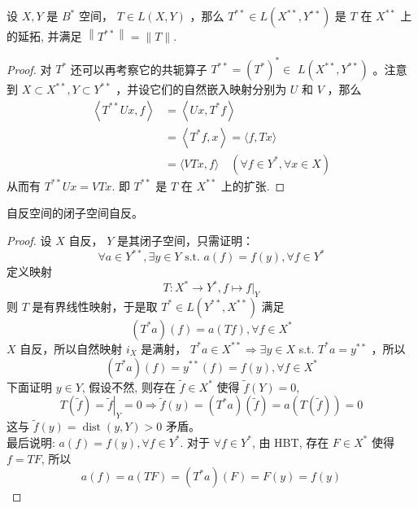 \documentclass[lang=cn,newtx,10pt,scheme=chinese,thmcnt=chapter]{elegantbook}
\begin{document}
\begin{theorem}
设 $X , Y$ 是 $B^*$ 空间， $T \in L ( X , Y )$ ，那么 $T^{* *} \in L \left( X ^{* *}, Y { }^{* *}\right)$ 是 $T$ 在 $X ^{* *}$ 上的延拓, 并满足 $\left\|T^{* *}\right\|=\|T\|$.
\end{theorem}

\begin{proof}
对 $T^*$ 还可以再考察它的共轭算子 $T^{* *}=\left(T^*\right)^* \in$ $L \left( X ^{* *}, Y ^{* *}\right)$ 。注意到 $X \subset X ^{* *}, Y \subset Y ^{* *}$ ，并设它们的自然嵌入映射分别为 $U$ 和 $V$ ，那么
\begin{equation*}
\begin{aligned}
\left\langle T^{* *} U x, f\right\rangle & =\left\langle U x, T^* f\right\rangle \\
& =\left\langle T^* f, x\right\rangle=\langle f, T x\rangle \\
& =\langle V T x, f\rangle \quad\left(\forall f \in Y ^*, \forall x \in X \right)
\end{aligned}
\end{equation*}
从而有 $T^{* *} U x=V T x$. 即 $T^{* *}$ 是 $T$ 在 $X ^{* *}$ 上的扩张. 
\end{proof}

\begin{theorem}[pettis]
自反空间的闭子空间自反。
\end{theorem}

\begin{proof}
设 $X$ 自反， $Y$ 是其闭子空间，只需证明：
\begin{equation*}
\forall a \in Y^{* *}, \exists y \in Y \text { s.t. } a(f)=f(y), \forall f \in Y^*
\end{equation*}
定义映射
\begin{equation*}
T: X^* \rightarrow Y^*,\left.f \mapsto f\right|_Y
\end{equation*}
则 $T$ 是有界线性映射，于是取 $T^* \in L \left(Y^{* *}, X^{* *}\right)$ 满足
\begin{equation*}
\left(T^* a\right)(f)=a(T f), \forall f \in X^*
\end{equation*}
$X$ 自反，所以自然映射 $i_X$ 是满射， $T^* a \in X^{* *} \Rightarrow \exists y \in X$ s.t. $T^* a=y^{* *}$ ，所以
\begin{equation*}
\left(T^* a\right)(f)=y^{* *}(f)=f(y), \forall f \in X^*
\end{equation*}
下面证明 $y \in Y$, 假设不然, 则存在 $\tilde{f} \in X^*$ 使得 $\tilde{f}(Y)=0$,
\begin{equation*}
T(\tilde{f})=\left.\tilde{f}\right|_Y=0 \Rightarrow \tilde{f}(y)=\left(T^* a\right)(\tilde{f})=a(T(\tilde{f}))=0
\end{equation*}
这与 $\tilde{f}(y)=\operatorname{dist}(y, Y)>0$ 矛盾。\\
最后说明: $a(f)=f(y), \forall f \in Y^*$. 对于 $\forall f \in Y^*$, 由 HBT, 存在 $F \in X^*$ 使得 $f=T F$, 所以
\begin{equation*}
a(f)=a(T F)=\left(T^* a\right)(F)=F(y)=f(y)
\end{equation*}
\end{proof}
\end{document}
